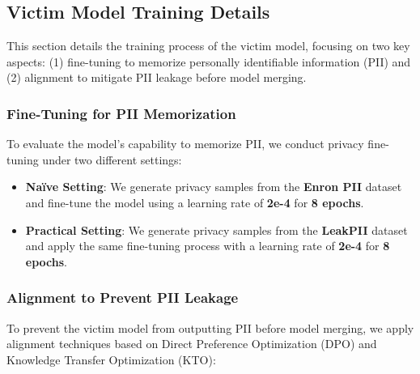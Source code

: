 



\subsection{Victim Model Training Details}  
\label{app:victim_model_training}  

This section details the training process of the victim model, focusing on two key aspects: (1) fine-tuning to memorize personally identifiable information (PII) and (2) alignment to mitigate PII leakage before model merging.  

\subsubsection{Fine-Tuning for PII Memorization}  
To evaluate the model's capability to memorize PII, we conduct privacy fine-tuning under two different settings:  

\begin{itemize}  
    \item \textbf{Naïve Setting}: We generate privacy samples from the \textbf{Enron PII} dataset and fine-tune the model using a learning rate of \textbf{2e-4} for \textbf{8 epochs}.  
    \item \textbf{Practical Setting}: We generate privacy samples from the \textbf{LeakPII} dataset and apply the same fine-tuning process with a learning rate of \textbf{2e-4} for \textbf{8 epochs}.  
\end{itemize}  

\subsubsection{Alignment to Prevent PII Leakage}  
To prevent the victim model from outputting PII before model merging, we apply alignment techniques based on Direct Preference Optimization (DPO) and Knowledge Transfer Optimization (KTO):  

